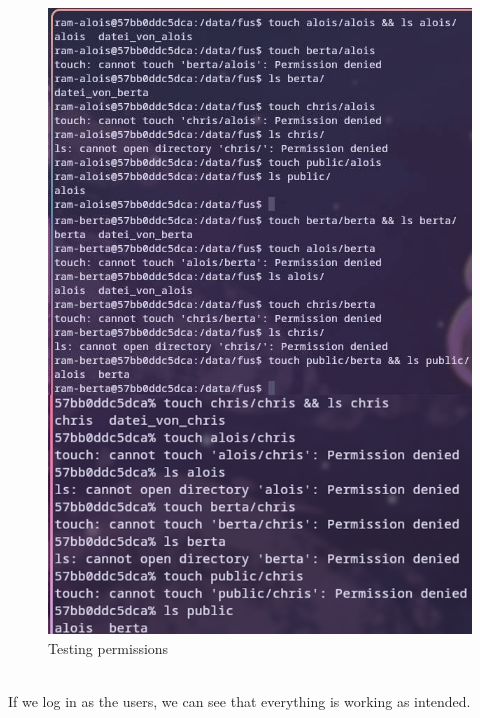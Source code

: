 \documentclass[a4paper]{article}
\begin{document}
\begin{figure}[h]
	\centering
	\includegraphics[scale=1.2]{images/testing_perms.png}
	\caption{Testing permissions}
\end{figure} \\
If we log in as the users, we can see that everything is working as intended.
\newpage
\end{document}
